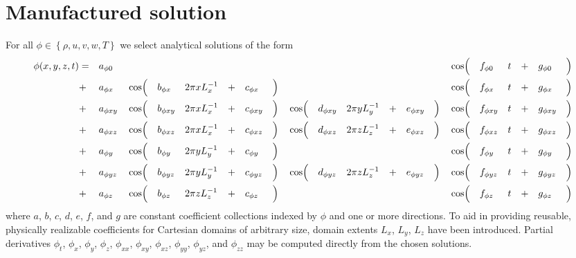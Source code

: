 \documentclass[10pt,reqno]{amsart}
\begin{document}
\section{Manufactured solution}
\label{sec:solution}

For all $\phi\in\left\{\rho, u, v, w, T\right\}$ we select analytical solutions
of the form
\begin{alignat}{20}
\label{eq:solution}
  \phi\!\left(x, y, z, t\right)
  &= &&a_{\phi{}0}  &&          &&             &&               &&  &&            &&       &&          &&             &&                &&  &&            &&        &&\cos\Bigl(&&f_{\phi{}0 } &&t &&+ &&g_{\phi{}0 }&&\Bigr)       \\
  &+ &&a_{\phi{}x } &&\cos\Bigl(&&b_{\phi{}x } &&2\pi x L_x^{-1}&&+ &&c_{\phi{}x }&&\Bigr) &&          &&             &&                &&  &&            &&        &&\cos\Bigl(&&f_{\phi{}x } &&t &&+ &&g_{\phi{}x }&&\Bigr) \notag\\
  &+ &&a_{\phi{}xy} &&\cos\Bigl(&&b_{\phi{}xy} &&2\pi x L_x^{-1}&&+ &&c_{\phi{}xy}&&\Bigr) &&\cos\Bigl(&&d_{\phi{}xy} &&2\pi y L_y^{-1} &&+ &&e_{\phi{}xy}&&\Bigr)  &&\cos\Bigl(&&f_{\phi{}xy} &&t &&+ &&g_{\phi{}xy}&&\Bigr) \notag\\
  &+ &&a_{\phi{}xz} &&\cos\Bigl(&&b_{\phi{}xz} &&2\pi x L_x^{-1}&&+ &&c_{\phi{}xz}&&\Bigr) &&\cos\Bigl(&&d_{\phi{}xz} &&2\pi z L_z^{-1} &&+ &&e_{\phi{}xz}&&\Bigr)  &&\cos\Bigl(&&f_{\phi{}xz} &&t &&+ &&g_{\phi{}xz}&&\Bigr) \notag\\
  &+ &&a_{\phi{}y } &&\cos\Bigl(&&b_{\phi{}y } &&2\pi y L_y^{-1}&&+ &&c_{\phi{}y }&&\Bigr) &&          &&             &&                &&  &&            &&        &&\cos\Bigl(&&f_{\phi{}y } &&t &&+ &&g_{\phi{}y }&&\Bigr) \notag\\
  &+ &&a_{\phi{}yz} &&\cos\Bigl(&&b_{\phi{}yz} &&2\pi y L_y^{-1}&&+ &&c_{\phi{}yz}&&\Bigr) &&\cos\Bigl(&&d_{\phi{}yz} &&2\pi z L_z^{-1} &&+ &&e_{\phi{}yz}&&\Bigr)  &&\cos\Bigl(&&f_{\phi{}yz} &&t &&+ &&g_{\phi{}yz}&&\Bigr) \notag\\
  &+ &&a_{\phi{}z } &&\cos\Bigl(&&b_{\phi{}z } &&2\pi z L_z^{-1}&&+ &&c_{\phi{}z }&&\Bigr) &&          &&             &&                &&  &&            &&        &&\cos\Bigl(&&f_{\phi{}z } &&t &&+ &&g_{\phi{}z }&&\Bigr) \notag
\end{alignat}
where $a$, $b$, $c$, $d$, $e$, $f$, and $g$ are constant coefficient
collections indexed by $\phi$ and one or more directions.  To aid in providing
reusable, physically realizable coefficients for Cartesian domains of arbitrary
size, domain extents $L_x$, $L_y$, $L_z$ have been introduced.  Partial
derivatives $\phi_{t }$, $\phi_{x }$, $\phi_{y }$, $\phi_{z }$, $\phi_{xx}$,
$\phi_{xy}$, $\phi_{xz}$, $\phi_{yy}$, $\phi_{yz}$, and $\phi_{zz}$ may be
computed directly from the chosen solutions.
\end{document}
